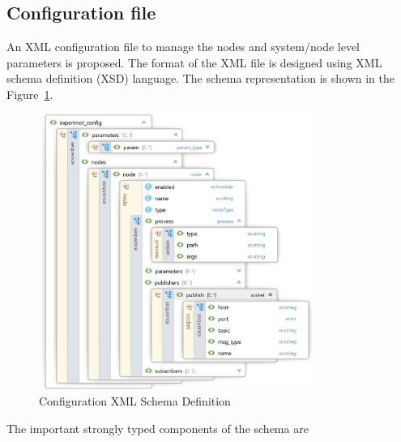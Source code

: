\subsection{Configuration file}
\label{sec:config_file}
An XML configuration file to manage the nodes and system/node level parameters is proposed. The format of the XML file is designed using XML schema definition (XSD) language. The schema representation is shown in the Figure~\ref{fig:config_xsd}. 
\begin{figure}[H]
\centering
\includegraphics[width=0.8\textwidth]{assets/xsd_config.eps}
\caption[Configuration XML Schema Definition]{Configuration XML Schema Definition}
\label{fig:config_xsd}
\end{figure}
The important strongly typed components of the schema are
